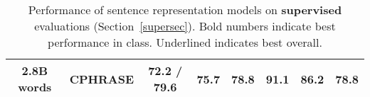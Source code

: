 \documentclass[11pt,letterpaper]{article}
\begin{document}
\begin{table*}[ht]
\begin{center}
{\begin{tabular}{c|l|cccccc}
          2.8B words &CPHRASE & 72.2	 / 79.6	& 75.7	& 78.8	& 91.1	&  86.2	& 78.8 \\
           
          \hline 
        \end{tabular}

    }
    \caption{\label{supervised} Performance of sentence representation models on {\bf supervised} evaluations  (Section~\ref{supersec}). Bold numbers indicate best performance in class. Underlined indicates best overall. }
  \end{center}
  \vspace*{-4ex}
\end{table*}

\begin{table*}[ht]
\small
\newcommand{\mc}[1]{\multicolumn{1}{l|}{#1}}
  \begin{center}


\end{center}
\end{table*}
\end{document}
